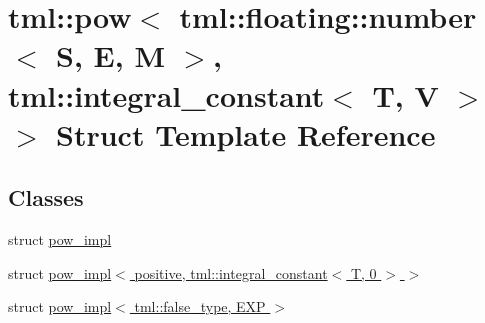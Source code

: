 \hypertarget{structtml_1_1pow_3_01tml_1_1floating_1_1number_3_01S_00_01E_00_01M_01_4_00_01tml_1_1integral__constant_3_01T_00_01V_01_4_01_4}{\section{tml\+:\+:pow$<$ tml\+:\+:floating\+:\+:number$<$ S, E, M $>$, tml\+:\+:integral\+\_\+constant$<$ T, V $>$ $>$ Struct Template Reference}
\label{structtml_1_1pow_3_01tml_1_1floating_1_1number_3_01S_00_01E_00_01M_01_4_00_01tml_1_1integral__constant_3_01T_00_01V_01_4_01_4}
}
\subsection*{Classes}
\begin{DoxyCompactItemize}
\item 
struct \hyperlink{structtml_1_1pow_3_01tml_1_1floating_1_1number_3_01S_00_01E_00_01M_01_4_00_01tml_1_1integral__co2c7d9442a0a05d572c8de564125efb27}{pow\+\_\+impl}
\item 
struct \hyperlink{structtml_1_1pow_3_01tml_1_1floating_1_1number_3_01S_00_01E_00_01M_01_4_00_01tml_1_1integral__co517f9860170f0627b591e9239a9c1aba}{pow\+\_\+impl$<$ positive, tml\+::integral\+\_\+constant$<$ T, 0 $>$ $>$}
\item 
struct \hyperlink{structtml_1_1pow_3_01tml_1_1floating_1_1number_3_01S_00_01E_00_01M_01_4_00_01tml_1_1integral__co391b9c019061240dafa8457ab56fcf00}{pow\+\_\+impl$<$ tml\+::false\+\_\+type, E\+X\+P $>$}
\end{DoxyCompactItemize}
